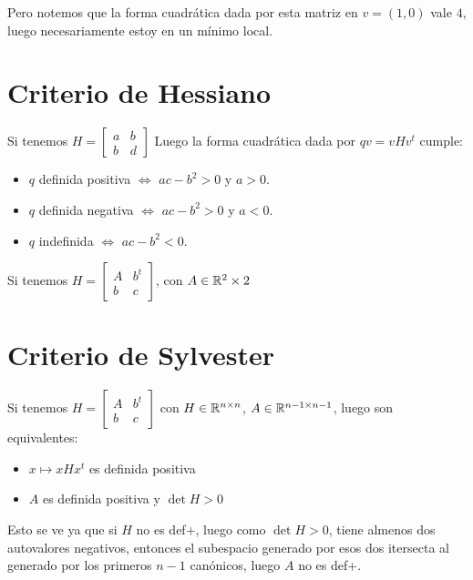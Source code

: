 \documentclass{article}
\begin{document}
Pero notemos que la forma cuadrática dada por esta matriz en $v = (1,0)$ vale $4$, luego necesariamente estoy en un mínimo local.

\section*{Criterio de Hessiano}
Si tenemos $
H =
\begin{bmatrix}
	a & b \\
	b & d
\end{bmatrix}
$
Luego la forma cuadrática dada por $qv = vHv^t$ cumple:
\begin{itemize}
	\item $q$ definida positiva $\iff$ $ac-b^2 > 0$ y $a > 0$.
	\item $q$ definida negativa $\iff$ $ac-b^2 > 0$ y $a < 0$.
	\item $q$ indefinida $\iff$ $ac-b^2 < 0$.
\end{itemize}

Si tenemos $
H =
\begin{bmatrix}
	A & b^t \\
	b & c
\end{bmatrix}
$, con $A \in \mathbb{R}{^2 \times 2}$

\section*{Criterio de Sylvester}
Si tenemos $H = 
\begin{bmatrix}
	A & b^t \\
	b & c
\end{bmatrix}$
con $H \in \mathbb{R}^{n \times n}$, $A \in \mathbb{R}^{n-1 \times n-1}$, luego son equivalentes:
\begin{itemize}
	\item $x \mapsto xHx^t$ es definida positiva
	\item $A$ es definida positiva y $\det H > 0$
\end{itemize}

Esto se ve ya que si $H$ no es def+, luego como $\det H > 0$, tiene almenos dos autovalores negativos, entonces el subespacio generado por esos dos itersecta al generado por los primeros $n-1$ canónicos, luego $A$ no es def+.
\end{document}
